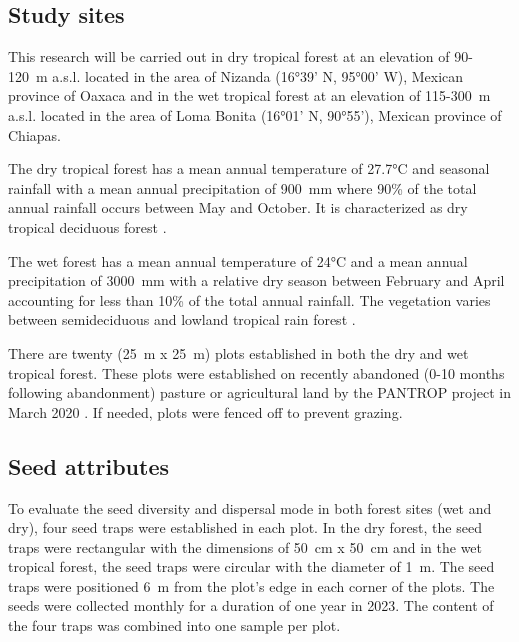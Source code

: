 

\subsection{Study sites}
This research will be carried out in dry tropical forest at an elevation of 90-120~m a.s.l. located in the area of Nizanda (16°39' N, 95°00' W), Mexican province of Oaxaca and in the wet tropical forest at an elevation of 115-300~m a.s.l. located in the area of Loma Bonita (16°01' N, 90°55'), Mexican province of Chiapas. 

The dry tropical forest has a mean annual temperature of 27.7°C and seasonal rainfall with a mean annual precipitation of 900~mm where 90\% of the total annual rainfall occurs between May and October. It is characterized as dry tropical deciduous forest \citep{hordijkLandUseHistory2024}. 

The wet forest has a mean annual temperature of 24°C and a mean annual precipitation of 3000~mm with a relative dry season between February and April accounting for less than 10\% of the total annual rainfall. The vegetation varies between semideciduous and lowland tropical rain forest \citep{hordijkLandUseHistory2024}.

There are twenty (25~m x 25~m) plots established in both the dry and wet tropical forest. These plots were established on recently abandoned (0-10 months following abandonment) pasture or agricultural land by the PANTROP project in March 2020 \citep{hordijkLandUseHistory2024}. If needed, plots were fenced off to prevent grazing. 


\subsection{Seed attributes}
To evaluate the seed diversity and dispersal mode in both forest sites (wet and dry), four seed traps were established in each plot. In the dry forest, the seed traps were rectangular with the dimensions of 50~cm x 50~cm and in the wet tropical forest, the seed traps were circular with the diameter of 1~m. The seed traps were positioned 6~m from the plot's edge in each corner of the plots. The seeds were collected monthly for a duration of one year in 2023. The content of the four traps was combined into one sample per plot.

